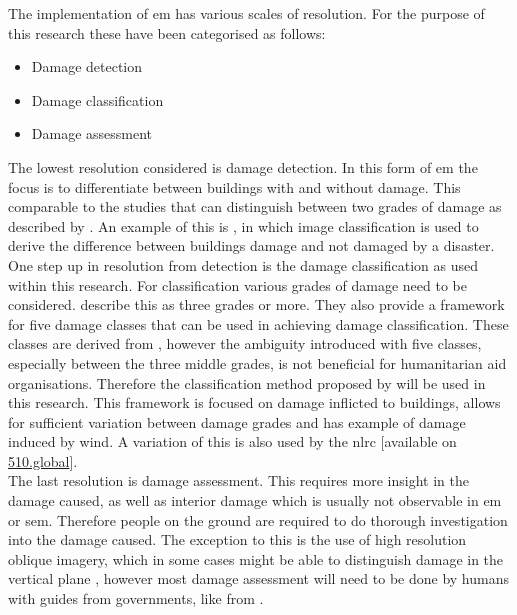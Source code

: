 The implementation of \ac{em} has various scales of resolution. For the purpose of this research these have been categorised as follows:

\begin{itemize}
	\item Damage detection
	\item Damage classification
	\item Damage assessment
\end{itemize}

The lowest resolution considered is damage detection. In this form of \ac{em} the focus is to differentiate between buildings with and without damage. This comparable to the studies that can distinguish between two grades of damage as described by \citet{Dong2013}. An example of this is \citet{Wang2012}, in which image classification is used to derive the difference between buildings damage and not damaged by a disaster.\\

One step up in resolution from detection is the damage classification as used within this research. For classification various grades of damage need to be considered. \cite{Dong2013} describe this as three grades or more. They also provide a framework for five damage classes that can be used in achieving damage classification. These classes are derived from \citet{Grunthal1998}, however the ambiguity introduced with five classes, especially between the three middle grades, is not beneficial for humanitarian aid organisations. Therefore the classification method proposed by \citet{AlAchkar2008} will be used in this research. This framework is focused on damage inflicted to buildings, allows for sufficient variation between damage grades and has example of damage induced by wind. A variation of this is also used by the \ac{nlrc} [available on \href{https://www.510.global/visual-guide-damage-assesment/}{510.global}].\\

The last resolution is damage assessment. This requires more insight in the damage caused, as well as interior damage which is usually not observable in \ac{em} or \ac{sem}. Therefore people on the ground are required to do thorough investigation into the damage caused. The exception to this is the use of high resolution oblique imagery, which in some cases might be able to distinguish damage in the vertical plane \citep{Vetrivel2016a}, however most damage assessment will need to be done by humans with guides from governments, like from \citet{FEMA2016}.\\

